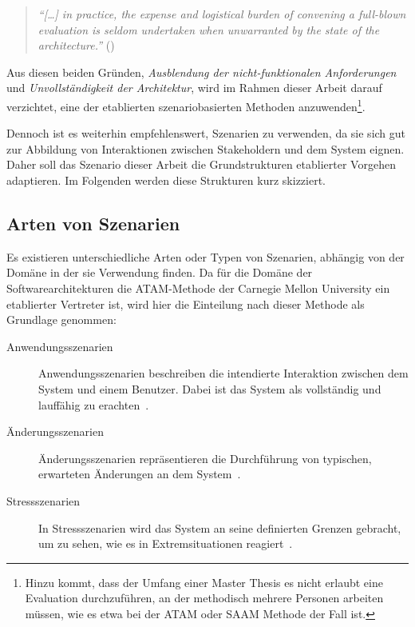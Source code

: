   \begin{quote}
    \emph{"`[\ldots] in practice, the expense and logistical burden of convening a full-blown evaluation is seldom undertaken when unwarranted by the state of the architecture."'} (\citep[S. 24]{evaluating_software_architectures})
  \end{quote}
  
  Aus diesen beiden Gründen, \emph{Ausblendung der nicht-funktionalen Anforderungen} und \emph{Unvollständigkeit der Architektur}, wird im Rahmen dieser Arbeit darauf verzichtet, eine der etablierten szenariobasierten Methoden anzuwenden\footnote{Hinzu kommt, dass der Umfang einer Master Thesis es nicht erlaubt eine Evaluation durchzuführen, an der methodisch mehrere Personen arbeiten müssen, wie es etwa bei der ATAM oder SAAM Methode der Fall ist.}.
  
  Dennoch ist es weiterhin empfehlenswert, Szenarien zu verwenden, da sie sich gut zur Abbildung von Interaktionen zwischen Stakeholdern und dem System eignen. Daher soll das Szenario dieser Arbeit die Grundstrukturen etablierter Vorgehen adaptieren. Im Folgenden werden diese Strukturen kurz skizziert.
  
\subsection{Arten von Szenarien} %
\label{sub:arten_von_szenarien}

  Es existieren unterschiedliche Arten oder Typen von Szenarien, abhängig von der Domäne in der sie Verwendung finden. Da für die Domäne der Softwarearchitekturen die ATAM-Methode der Carnegie Mellon University \citep{kazman2000ama} ein etablierter Vertreter ist, wird hier die Einteilung nach dieser Methode als Grundlage genommen:
  
  \begin{description}
    \item[Anwendungsszenarien] Anwendungsszenarien beschreiben die intendierte Interaktion zwischen dem System und einem Benutzer. Dabei ist das System als vollständig und lauffähig zu erachten~\cite[S. 14]{kazman2000ama}.
    \item[Änderungsszenarien] Änderungsszenarien repräsentieren die Durchführung von typischen, erwarteten Änderungen an dem System~\cite[S. 14f]{kazman2000ama}.
    \item[Stressszenarien] In Stressszenarien wird das System an seine definierten Grenzen gebracht, um zu sehen, wie es in Extremsituationen reagiert~\cite[S. 15]{kazman2000ama}.
  \end{description}
  
